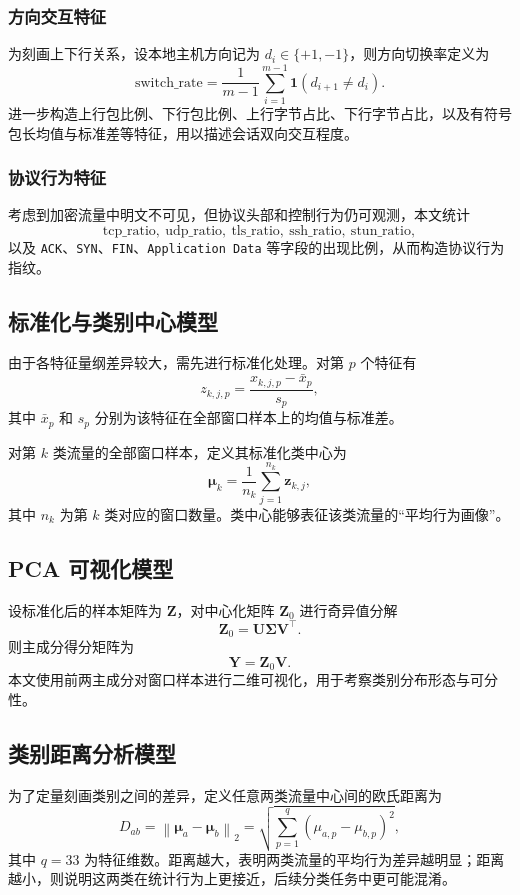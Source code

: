 \documentclass[UTF8,a4paper,12pt]{ctexart}
\begin{document}
\subsubsection{方向交互特征}
为刻画上下行关系，设本地主机方向记为 $d_i\in\{+1,-1\}$，则方向切换率定义为
\[
\mathrm{switch\_rate}=\frac1{m-1}\sum_{i=1}^{m-1}\mathbf{1}(d_{i+1}\neq d_i).
\]
进一步构造上行包比例、下行包比例、上行字节占比、下行字节占比，以及有符号包长均值与标准差等特征，用以描述会话双向交互程度。

\subsubsection{协议行为特征}
考虑到加密流量中明文不可见，但协议头部和控制行为仍可观测，本文统计
\[
\mathrm{tcp\_ratio},\ \mathrm{udp\_ratio},\ \mathrm{tls\_ratio},\ \mathrm{ssh\_ratio},\ \mathrm{stun\_ratio},
\]
以及 \texttt{ACK}、\texttt{SYN}、\texttt{FIN}、\texttt{Application Data} 等字段的出现比例，从而构造协议行为指纹。

\subsection{标准化与类别中心模型}
由于各特征量纲差异较大，需先进行标准化处理。对第 $p$ 个特征有
\[
z_{k,j,p}=\frac{x_{k,j,p}-\bar x_p}{s_p},
\]
其中 $\bar x_p$ 和 $s_p$ 分别为该特征在全部窗口样本上的均值与标准差。

对第 $k$ 类流量的全部窗口样本，定义其标准化类中心为
\[
\bm{\mu}_k=\frac1{n_k}\sum_{j=1}^{n_k}\bm{z}_{k,j},
\]
其中 $n_k$ 为第 $k$ 类对应的窗口数量。类中心能够表征该类流量的“平均行为画像”。

\subsection{PCA 可视化模型}
设标准化后的样本矩阵为 $\bm{Z}$，对中心化矩阵 $\bm{Z}_0$ 进行奇异值分解
\[
\bm{Z}_0=\bm{U}\bm{\Sigma}\bm{V}^\top.
\]
则主成分得分矩阵为
\[
\bm{Y}=\bm{Z}_0\bm{V}.
\]
本文使用前两主成分对窗口样本进行二维可视化，用于考察类别分布形态与可分性。

\subsection{类别距离分析模型}
为了定量刻画类别之间的差异，定义任意两类流量中心间的欧氏距离为
\[
D_{ab}=\left\|\bm{\mu}_a-\bm{\mu}_b\right\|_2
=\sqrt{\sum_{p=1}^q(\mu_{a,p}-\mu_{b,p})^2},
\]
其中 $q=33$ 为特征维数。距离越大，表明两类流量的平均行为差异越明显；距离越小，则说明这两类在统计行为上更接近，后续分类任务中更可能混淆。
\end{document}
